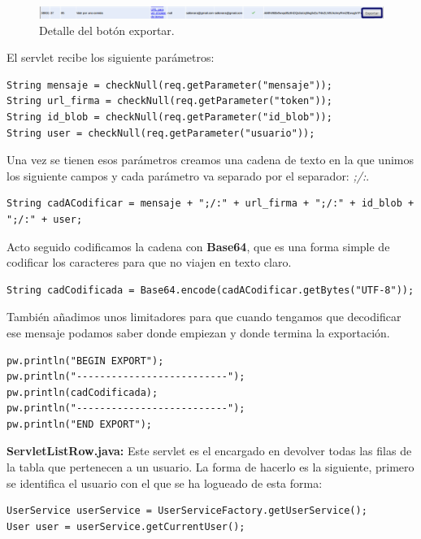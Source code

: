 \begin{description}
\begin{figure}
  \centering
    \includegraphics[scale=0.5]{./GoogleAppEngine/imagenes/botonExportar.png}
  \caption{Detalle del botón exportar.}
  \label{fig:botonExportar}
\end{figure}

El servlet recibe los siguiente parámetros:

\begin{lstlisting}[style=Java]
String mensaje = checkNull(req.getParameter("mensaje"));
String url_firma = checkNull(req.getParameter("token"));
String id_blob = checkNull(req.getParameter("id_blob"));
String user = checkNull(req.getParameter("usuario"));
\end{lstlisting}

Una vez se tienen esos parámetros creamos una cadena de texto en la que unimos los siguiente campos y cada parámetro va separado por el separador: \textit{;/:}.
\begin{lstlisting}[style=Java]
String cadACodificar = mensaje + ";/:" + url_firma + ";/:" + id_blob + ";/:" + user;
\end{lstlisting}

Acto seguido codificamos la cadena con \textbf{Base64}, que es una forma simple de codificar los caracteres para que no viajen en texto claro.
\begin{lstlisting}[style=Java]
String cadCodificada = Base64.encode(cadACodificar.getBytes("UTF-8"));
\end{lstlisting}

También añadimos unos limitadores para que cuando tengamos que decodificar ese mensaje podamos saber donde empiezan y donde termina la exportación.
\begin{lstlisting}[style=Java]
pw.println("BEGIN EXPORT");
pw.println("--------------------------");
pw.println(cadCodificada);
pw.println("--------------------------");
pw.println("END EXPORT");
\end{lstlisting}

\item \textbf{ServletListRow.java:} Este servlet es el encargado en devolver todas las filas de la tabla que pertenecen a un usuario. La forma de hacerlo es la siguiente, primero se identifica el usuario con el que se ha logueado de esta forma:

\begin{lstlisting}[style=Java]
UserService userService = UserServiceFactory.getUserService();
User user = userService.getCurrentUser();
\end{lstlisting}


\end{description}
